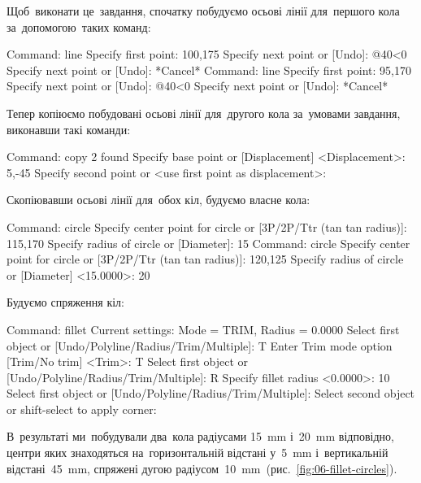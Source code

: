 \documentclass[
	a4paper,
	oneside,
	BCOR = 10mm,
	DIV = 12,
	12pt,
	headings = normal,
]{scrartcl}
\begin{document}
			Щоб~виконати це~завдання, спочатку побудуємо осьові лінії для~першого кола за~допомогою таких команд:
			\begin{codegeneric}
				Command: line
				Specify first point: 100,175
				Specify next point or [Undo]: @40<0
				Specify next point or [Undo]: *Cancel*
				Command: line
				Specify first point: 95,170
				Specify next point or [Undo]: @40<0
				Specify next point or [Undo]: *Cancel*
			\end{codegeneric}
			Тепер копіюємо побудовані осьові лінії для~другого кола за~умовами завдання, виконавши такі команди:
			\begin{codegeneric}
				Command: copy
				2 found
				Specify base point or [Displacement] <Displacement>: 5,-45
				Specify second point or <use first point as displacement>:
			\end{codegeneric}
			Скопіювавши осьові лінії для~обох кіл, будуємо власне кола:
			\begin{codegeneric}
				Command: circle
				Specify center point for circle or [3P/2P/Ttr (tan tan radius)]: 115,170
				Specify radius of circle or [Diameter]: 15
				Command: circle
				Specify center point for circle or [3P/2P/Ttr (tan tan radius)]: 120,125
				Specify radius of circle or [Diameter] <15.0000>: 20
			\end{codegeneric}
			Будуємо спряження кіл:
			\begin{codegeneric}
				Command: fillet
				Current settings: Mode = TRIM, Radius = 0.0000
				Select first object or [Undo/Polyline/Radius/Trim/Multiple]: T
				Enter Trim mode option [Trim/No trim] <Trim>: T
				Select first object or [Undo/Polyline/Radius/Trim/Multiple]: R
				Specify fillet radius <0.0000>: 10
				Select first object or [Undo/Polyline/Radius/Trim/Multiple]:
				Select second object or shift-select to apply corner:
			\end{codegeneric}
			В~результаті ми~побудували два~кола радіусами \SI{15}{\milli\metre} і~\SI{20}{\milli\metre} відповідно, центри яких знаходяться на~горизонтальній відстані у~\SI{5}{\milli\metre} і~вертикальній відстані~\SI{45}{\milli\metre}, спряжені дугою радіусом~\SI{10}{\milli\metre}~(рис.~\ref{fig:06-fillet-circles}).
\end{document}
